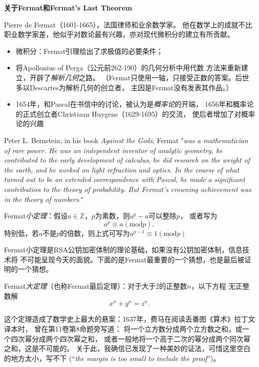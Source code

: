 \begin{shaded}
	{\bf 关于Fermat和Fermat's Last Theorem}
	
	Pierre de Fermat（1601-1665），法国律师和业余数学家。
	他在数学上的成就不比职业数学家差，他似乎对数论最有兴趣，亦对现代微积分的建立有所贡献。
	\begin{itemize}
	  \item 微积分：Fermat引理给出了求极值的必要条件；
	  \item 将Apollonius of Perga（公元前262-190）的几何分析中用代数
	  方法来重新建立，开辟了{\it 解析几何}之路。
	  （Fermat只使用一轴，只接受正数的答案。后世多以Descartes为解析几何的创立者，
	  主因是Fermat没有发表其作品。）
	  \item 1654年，和Pascal在书信中的讨论，被认为是{\it 概率论}的开端，
	  1656年和概率论的正式创立者Christiaan Huygens（1629-1695）的交流，
	  使后者增加了对概率论的兴趣
	\end{itemize}
	
	Peter L. Bernstein, in his book {\it Against the Gods}, 
	Fermat "{\it was a mathematician of rare power. He was an 
	independent inventor of analytic geometry, he contributed 
	to the early development of calculus, he did research on 
	the weight of the earth, and he worked on light refraction 
	and optics. In the course of what turned out to be an extended 
	correspondence with Pascal, he made a significant contribution 
	to the theory of probability. But Fermat's crowning achievement 
	was in the theory of numbers}."
	
	\begin{tcolorbox}
		Fermat{\it 小定理}：假设$a\in\mathbb{Z}$，$p$为素数，则$a^p-a$可以整除$p$，
		或者写为
		$$a^p\equiv a(\mathrm{mod}p),$$
		特别低，若$a$不是$p$的倍数，则上式可写为$a^{p-1}\equiv 1(\mathrm{mod} p)$
	\end{tcolorbox}
	
	Fermat小定理是RSA公钥加密体制的理论基础，如果没有公钥加密体制，信息技术将
	不可能呈现今天的面貌。下面的是Fermat最重要的一个猜想，也是最后被证明的一个猜想。
	
	\begin{tcolorbox}
		Fermat{\it 大定理}（也称Fermat最后定理）：对于大于$2$的正整数$n$，以下方程
		无正整数解
		$$x^n+y^n=z^n.$$
	\end{tcolorbox}
	
	这个定理造成了数学史上最大的悬案：1637年，费马在阅读丢番图《算术》拉丁文译本时，
	曾在第11卷第8命题旁写道：
	{\kaishu 将一个立方数分成两个立方数之和，或一个四次幂分成两个四次幂之和，
	或者一般地将一个高于二次的幂分成两个同次幂之和，这是不可能的。
	关于此，我确信已发现了一种美妙的证法，可惜这里空白的地方太小，写不下
	(“{\it the margin is too small to include the proof}”)。}
	

\end{shaded}
